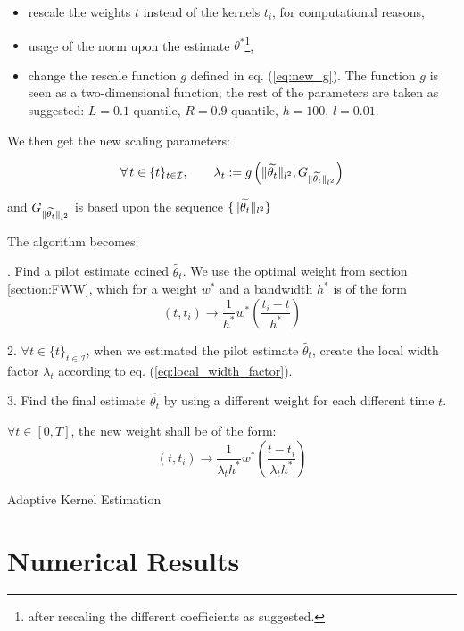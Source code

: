 \documentclass[11pt]{book}
\newcommand{\sequencetime}{\{t\}_{t \in \mathcal I} }
\begin{document}
\begin{itemize}
\item rescale the weights $t$ instead of the kernels $t_i$, for computational reasons,
\item usage of the norm upon the estimate $\theta^*$\footnote{after rescaling the different coefficients as suggested.},
\item change the rescale function $g$ defined in eq. (\ref{eq:new_g}). The function $g$ is seen as a two-dimensional function; the rest of the parameters are taken as suggested: $L = 0.1$-quantile, $R = 0.9$-quantile, $h = 100$, $l = 0.01$.
\end{itemize}


We then get the new scaling parameters:


\begin{equation}
\forall t \in \sequencetime, \qquad \lambda_{t} :=  
g \left (\norm{\widetilde{\theta_t}}_{l^2}, 
G_{\norm{\widetilde{\theta_t}}_{l^2}} \right)   
\end{equation}

and  $ G_{\lVert \widetilde{\theta_t}\rVert_{l^2}} $ is based upon the sequence $\{ \lVert \widetilde{\theta_t}\rVert_{l^2} \} $


The algorithm becomes:


\begin{algorithm}[H]
\label{algo:adaptive2}
. \quad Find a pilot estimate coined $\widetilde{\theta_t}$. We use the optimal weight from section \ref{section:FWW}, which for a weight $w^*$ and a bandwidth $h^*$ is of the form  $$ (t, t_i) \to \frac 1 {h^*} w^* \left ( \frac{t_i - t }{h^*} \right ) $$ 

2. \quad $\forall t \in \sequencetime$, when we estimated the pilot estimate $\widetilde{\theta_t}$, create the local width factor $\lambda_t$ according to eq. (\ref{eq:local_width_factor}). 

3. \quad Find the final estimate $\hat{\theta_t}$ by using a different weight for each different time $t$. 

$\forall t \in [0,T]$, the new weight shall be of the form:
$$ (t, t_i) \to \frac 1 {\lambda_{t} h^*} w^* \left ( \frac{t - t_i}{\lambda_{t} h^*} \right )$$ 
\caption{Adaptive Kernel Estimation}
\end{algorithm}








\chapter{Numerical Results}
\end{document}
